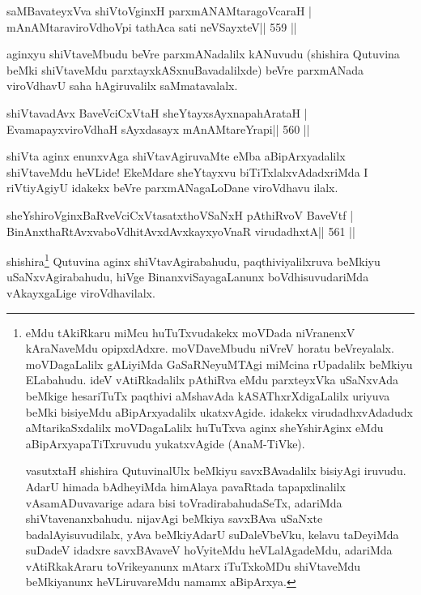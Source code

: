 \begin{shl}
saMBavateyxVva shiVtoV\s ginxH parxmANAMtaragoVcaraH |
mAnAMtaraviroVdhoV\s pi tathAca sati neVSayxteV\hfill || 559 ||
\end{shl}

\begin{artha}
aginxyu shiVtaveMbudu beVre parxmANadalilx kANuvudu (shishira Qutuvina beMki shiVtaveMdu parxtayxkASxnuBavadalilxde) beVre parxmANada viroVdhavU saha hAgiruvalilx saMmatavalalx.
\end{artha}

\begin{shl}
shiVtavadAvx BaveVciCxVtaH sheYtayxsAyxnapahArataH |
EvamapayxviroVdhaH sAyxdasayx mAnAMtareYrapi\hfill || 560 ||
\end{shl}

\begin{artha}
shiVta aginx enunxvAga shiVtavAgiruvaMte eMba aBipArxyadalilx shiVtaveMdu heVLide! EkeMdare sheYtayxvu biTiTxlalxvAdadxriMda I riVtiyAgiyU idakekx beVre parxmANagaLoDane viroVdhavu ilalx.
\end{artha}

\begin{shl}
sheYshiroV\s ginxBaRveVciCxVtasatxthoVSaNxH pAthiRvoV BaveVtf |
BinAnxthaRtAvxvaboVdhitAvxdAvxkayxyoVnaR virudadhxtA\hfill || 561 ||
\end{shl}

\begin{artha}
shishira\footnote{eMdu tAkiRkaru miMcu huTuTxvudakekx moVDada niVranenxV
kAraNaveMdu opipxdAdxre. moVDaveMbudu niVreV horatu beVreyalalx.
moVDagaLalilx gALiyiMda GaSaRNeyuMTAgi miMcina rUpadalilx beMkiyu
ELabahudu. ideV vAtiRkadalilx pAthiRva eMdu parxteyxVka uSaNxvAda
beMkige hesariTuTx paqthivi aMshavAda kASAThxrXdigaLalilx uriyuva beMki
bisiyeMdu aBipArxyadalilx ukatxvAgide. idakekx virudadhxvAdadudx
aMtarikaSxdalilx moVDagaLalilx huTuTxva aginx sheYshirAginx eMdu
aBipArxyapaTiTxruvudu yukatxvAgide (AnaM-TiVke).

vasutxtaH shishira QutuvinalUlx beMkiyu savxBAvadalilx bisiyAgi
iruvudu. AdarU himada bAdheyiMda himAlaya pavaRtada tapapxlinalilx
vAsamADuvavarige adara bisi toVradirabahudaSeTx, adariMda
shiVtavenanxbahudu. nijavAgi beMkiya savxBAva uSaNxte
badalAyisuvudilalx, yAva beMkiyAdarU suDaleVbeVku, kelavu taDeyiMda
suDadeV idadxre savxBAvaveV hoVyiteMdu heVLalAgadeMdu, adariMda
vAtiRkakAraru toVrikeyanunx mAtarx iTuTxkoMDu shiVtaveMdu beMkiyanunx
heVLiruvareMdu namamx aBipArxya.} Qutuvina aginx shiVtavAgirabahudu, paqthiviyalilxruva beMkiyu
uSaNxvAgirabahudu, hiVge BinanxviSayagaLanunx boVdhisuvudariMda
vAkayxgaLige viroVdhavilalx.
\end{artha}

